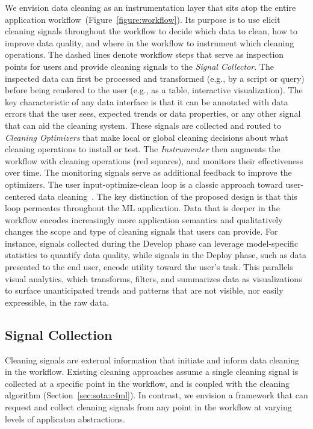 \documentclass[11pt,dvipsnames]{article}
\begin{document}
We envision data cleaning as an instrumentation layer that sits atop the entire application workflow~(Figure~\ref{figure:workflow}).  Its purpose is to use elicit cleaning signals throughout the workflow to decide which data to clean, how to improve data quality, and where in the workflow to instrument which cleaning operations.    
%
The dashed lines denote workflow steps that serve as inspection points for users and provide cleaning signals to the {\it Signal Collector}. The inspected data can first be processed and transformed (e.g., by a script or query) before being rendered to the user (e.g., as a table, interactive visualization).  The key characteristic of any data interface is that it can be annotated with data errors that the user sees, expected trends or data properties, or any other signal that can aid the cleaning system.  These signals are collected and routed to {\it Cleaning Optimizers} that make local or global cleaning decisions about what cleaning operations to install or test. The {\it Instrumenter} then augments the workflow with cleaning operations (red squares), and monitors their effectiveness over time.  The monitoring signals serve as additional feedback to improve the optimizers.  
The user input-optimize-clean loop is a classic approach toward user-centered data cleaning~\cite{End2EndHumanCentricCleaning}.  The key distinction of the proposed design is that this loop permeates throughout the ML application.   Data that is deeper in the workflow encodes increasingly more application semantics and qualitatively changes the scope and type of cleaning signals that users can provide.   For instance, signals collected during the Develop phase can leverage model-specific statistics to quantify data quality, while signals in the Deploy phase, such as data presented to the end user, encode utility toward the user's task. This parallels visual analytics, which transforms, filters, and summarizes data as visualizations to surface unanticipated trends and patterns that are not visible, nor easily expressible, in the raw data. 

\subsection{Signal Collection}

Cleaning signals are external information that initiate and inform data cleaning in the workflow.  Existing cleaning approaches assume a single cleaning signal is collected at a specific point in the workflow, and is coupled with the cleaning algorithm (Section~\ref{sec:sota:c4ml}).  In contrast, we envision a framework that can request and collect cleaning signals from any point in the workflow at varying levels of applicaton abstractions. 
\end{document}
